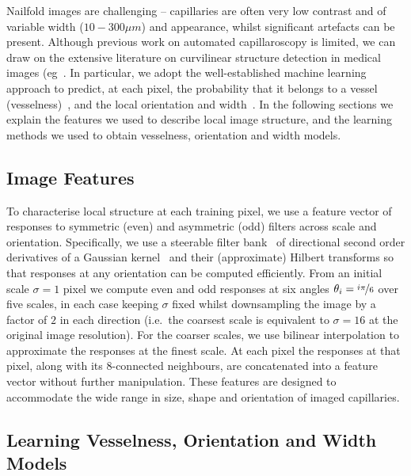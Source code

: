 \documentclass[runningheads,a4paper]{llncs}
\def\ie{i.e.}
\begin{document}
Nailfold images are challenging -- capillaries are often very low contrast and of variable width ($10-300 \mu m$) and appearance, whilst significant artefacts can be present. Although previous work on automated capillaroscopy is limited, we can draw on the extensive literature on curvilinear structure detection in medical images (eg~\cite{Staal_etal_TMI04,Soares_etal_TMI06,Berks_etal_IPMI11}.  In particular, we adopt the well-established machine learning approach to predict, at each pixel, the probability that it belongs to a vessel (vesselness)~\cite{Soares_etal_TMI06}, and the local orientation and width~\cite{Berks_etal_IPMI11}. In the following sections we explain the features we used to describe local image structure, and the learning methods we used to obtain vesselness, orientation and width models.

\subsection{Image Features}
\label{s:image_features}
To characterise local structure at each training pixel, we use a feature vector of responses to symmetric (even) and asymmetric (odd) filters across scale and orientation. Specifically, we use a steerable filter bank~\cite{Freeman_Adelson_TPAMI91} of directional second order derivatives of a Gaussian kernel~\cite{Staal_etal_TMI04} and their (approximate) Hilbert transforms so that responses at any orientation can be computed efficiently. From an initial scale $\sigma=1$ pixel we compute even and odd responses at six angles $\theta_i = \nicefrac{i\pi}{6}$ over five scales, in each case keeping $\sigma$ fixed whilst downsampling the image by a factor of $2$ in each direction (\ie~the coarsest scale is equivalent to $\sigma=16$ at the original image resolution). For the coarser scales, we use bilinear interpolation to approximate the responses at the finest scale. At each pixel the responses at that pixel, along with its 8-connected neighbours, are concatenated into a feature vector without further manipulation. These features are designed to accommodate the wide range in size, shape and orientation of imaged capillaries.

\subsection{Learning Vesselness, Orientation and Width Models}
\end{document}
